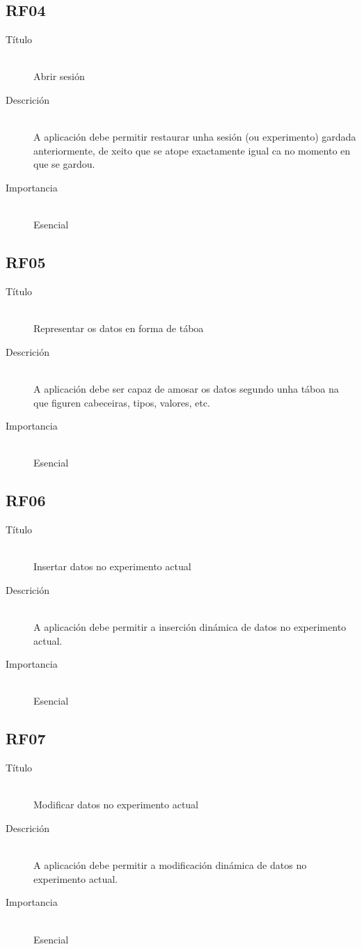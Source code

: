 \subsection*{RF04}
\begin{description}
\item[Título] \hfill \\
Abrir sesión
\item[Descrición] \hfill \\
A aplicación debe permitir restaurar unha sesión (ou experimento) gardada anteriormente, de xeito que se atope exactamente igual ca no momento en que se gardou.
\item[Importancia] \hfill \\
Esencial
\end{description}

\subsection*{RF05}
\begin{description}
\item[Título] \hfill \\
Representar os datos en forma de táboa
\item[Descrición] \hfill \\
A aplicación debe ser capaz de amosar os datos segundo unha táboa na que figuren cabeceiras, tipos, valores, etc.
\item[Importancia] \hfill \\
Esencial
\end{description}

\subsection*{RF06}
\begin{description}
\item[Título] \hfill \\
Insertar datos no experimento actual
\item[Descrición] \hfill \\
A aplicación debe permitir a inserción dinámica de datos no experimento actual.
\item[Importancia] \hfill \\
Esencial
\end{description}

\subsection*{RF07}
\begin{description}
\item[Título] \hfill \\
Modificar datos no experimento actual
\item[Descrición] \hfill \\
A aplicación debe permitir a modificación dinámica de datos no experimento actual.
\item[Importancia] \hfill \\
Esencial
\end{description}

